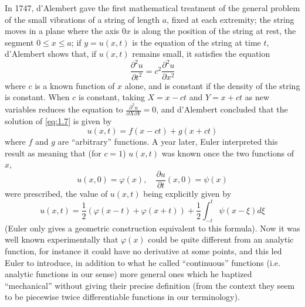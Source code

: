 \documentclass[12pt,a4paper,leqno,twoside]{extbook}
\newcommand{\pder}[2]{\frac{\partial #1}{\partial #2}}
\begin{document}
In 1747, d'Alembert gave the first mathematical treatment of the general problem of the small vibrations of a string of length \(a\), fixed at each extremity; the string moves in a plane where the axis \(0x\) is along the position of the string at rest, the segment \(0 \leq x \leq a\); if \(y = u(x,t)\) is the equation of the string at time \(t\), d'Alembert shows that, if \(u(x,t)\) remains small, it satisfies the equation
\begin{equation}
    \label{eq:1.7}
    \frac{\partial^2 u}{\partial t^2} = c^2 \frac{\partial^2 u}{\partial x^2}
\end{equation}
where \(c\) is a known function of \(x\) alone, and is constant if the density of the string is constant. When \(c\) is constant, taking \(X = x-ct\) and \(Y = x+ct\) as new variables reduces the equation to \(\frac{\partial^2 u}{\partial X \partial Y} = 0\), and d'Alembert concluded that the solution of \eqref{eq:1.7} is given by
\begin{equation}
    \label{eq:1.8}
    u(x,t) = f(x - ct) + g(x + ct)
\end{equation}
where \(f\) and \(g\) are ``arbitrary'' functions. A year later, Euler interpreted this result as meaning that (for \(c=1\)) \(u(x,t)\) was known once the two functions of \(x\),
\begin{equation}
    \label{eq:1.9}
    u(x,0) = \varphi(x), \quad \pder{u}{t}(x,0) = \psi(x)
\end{equation}
were prescribed, the value of \(u(x,t)\) being explicitly given by
\begin{equation}
    \label{eq:1.10}
    u(x,t) = \frac{1}{2} \left(\varphi(x-t) + \varphi(x+t)\right) + \frac{1}{2} \int_{-t}^t \psi(x - \xi) d\xi
\end{equation}
(Euler only gives a geometric construction equivalent to this formula). Now it was well known experimentally that \(\varphi(x)\) could be quite different from an analytic function, for instance it could have no derivative at some points, and this led Euler to introduce, in addition to what he called ``continuous'' functions (i.e. analytic functions in our sense) more general ones which he baptized ``mechanical'' without giving their precise definition (from the context they seem to be piecewise twice differentiable functions in our terminology).
\end{document}
